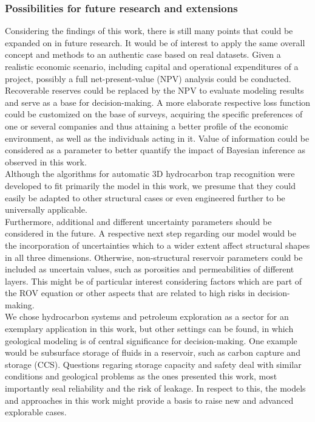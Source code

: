	\subsubsection{Possibilities for future research and extensions}	
	Considering the findings of this work, there is still many points that could be expanded on in future research. It would be of interest to apply the same overall concept and methods to an authentic case based on real datasets. Given a realistic economic scenario, including capital and operational expenditures of a project, possibly a full net-present-value (NPV) analysis could be conducted. Recoverable reserves could be replaced by the NPV to evaluate modeling results and serve as a base for decision-making. A more elaborate respective loss function could be customized on the base of surveys, acquiring the specific preferences of one or several companies and thus attaining a better profile of the economic environment, as well as the individuals acting in it. Value of information could be considered as a parameter to better quantify the impact of Bayesian inference as observed in this work.\\
	Although the algorithms for automatic 3D hydrocarbon trap recognition were developed to fit primarily the model in this work, we presume that they could easily be adapted to other structural cases or even engineered further to be universally applicable.\\
	Furthermore, additional and different uncertainty parameters should be considered in the future. A respective next step regarding our model would be the incorporation of uncertainties which to a wider extent affect structural shapes in all three dimensions. Otherwise, non-structural reservoir parameters could be included as uncertain values, such as porosities and permeabilities of different layers. This might be of particular interest considering factors which are part of the ROV equation or other aspects that are related to high risks in decision-making.\\
	We chose hydrocarbon systems and petroleum exploration as a sector for an exemplary application in this work, but other settings can be found, in which geological modeling is of central significance for decision-making. One example would be subsurface storage of fluids in a reservoir, such as carbon capture and storage (CCS). Questions regaring storage capacity and safety deal with similar conditions and geological problems as the ones presented this work, most importantly seal reliability and the risk of leakage. In respect to this, the models and approaches in this work might provide a basis to raise new and advanced explorable cases.